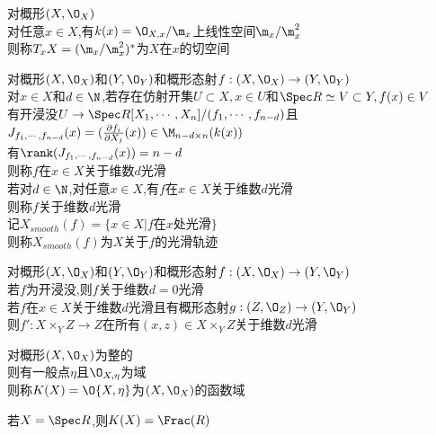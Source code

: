\begin{dingyi}
对概形$(X,\O_{X})$\\
对任意$x\in X$,有$k(x)=\O_{X,x}/\m_{x}$上线性空间$\m_{x}/\m_{x}^2$\\
则称$T_{x}X=(\m_{x}/\m_{x}^2)^{*}$为$X$在$x$的切空间
\end{dingyi}

\begin{dingyi}
对概形$(X,\O_{X})$和$(Y,\O_{Y})$和概形态射$f:(X,\O_{X})\to (Y,\O_{Y})$\\
对$x\in X$和$d\in \N$,若存在仿射开集$U\subset X,x\in U$和$\Spec R\simeq V\subset Y,f(x)\in V$\\
有开浸没$U\to \Spec R[X_1,\cdots,X_n]/(f_1,\cdots,f_{n-d})$且$J_{f_1,\cdots,f_{n-d}}(x)=(\frac{\partial f_i}{\partial X_j}(x))\in\M_{n-d\times n}(k(x))$\\
有$\rank(J_{f_1,\cdots,f_{n-d}}(x))=n-d$\\
则称$f$在$x\in X$关于维数$d$光滑\\
若对$d\in\N$,对任意$x\in X$,有$f$在$x\in X$关于维数$d$光滑\\
则称$f$关于维数$d$光滑\\
记$X_{smooth}(f)=\{x\in X|f\text{在}x\text{处光滑}\}$\\
则称$X_{smooth}(f)$为$X$关于$f$的光滑轨迹
\end{dingyi}

\begin{dingli}
对概形$(X,\O_{X})$和$(Y,\O_{Y})$和概形态射$f:(X,\O_{X})\to (Y,\O_{Y})$\\
若$f$为开浸没,则$f$关于维数$d=0$光滑\\
若$f$在$x\in X$关于维数$d$光滑且有概形态射$g:(Z,\O_{Z})\to (Y,\O_{Y})$\\
则$f':X\times_{Y}Z\to Z$在所有$(x,z)\in X\times_{Y}Z$关于维数$d$光滑
\end{dingli}

\begin{dingyi}
对概形$(X,\O_{X})$为整的\\
则有一般点$\eta$且$\O_{X,\eta}$为域\\
则称$K(X)=\O{X,\eta}$为$(X,\O_{X})$的函数域
\end{dingyi}

\begin{zhu}
若$X=\Spec R$,则$K(X)=\Frac(R)$
\end{zhu}

